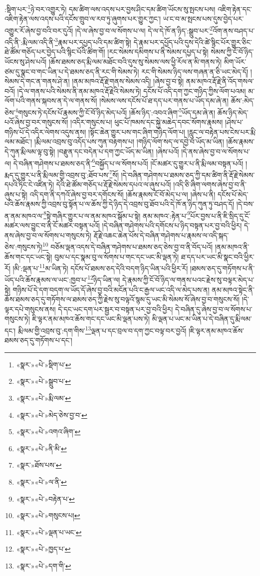 :སྡིག་པར་\footnote{«སྣར་»«པེ་»སྡིག་པ་}ཉེ་བར་འགྱུར་ཏེ། དམ་ཚིག་ལས་འདས་པར་བྱས་ཤིང་དམ་ཚིག་ཡོངས་སུ་སྤངས་པས། འཇིག་རྟེན་དང་འཇིག་རྟེན་ལས་འདས་པའི་དངོས་གྲུབ་ལ་རབ་ཏུ་ཞུགས་པར་གྱུར་ཀྱང་། ཡ་ང་བ་མ་སྤངས་པས་དུས་བྱེད་པར་འགྱུར་རོ་ཞེས་བྱ་བའི་བར་དུའོ། །དེ་ལ་ཞེས་བྱ་བ་ལ་སོགས་པ་ལ། དེ་ལ་དེ་ཁོ་ན་ཉིད་:སྒྲུབ་པར་\footnote{«སྣར་»«པེ་»སྒྲུབ་པ་}འོག་ནས་བཤད་པ་འདི་ནི་:རྨི་ལམ་འདི་ནི་\footnote{«སྣར་»«པེ་»རྨི་ལམ་}རྣམ་པར་དཔྱད་པའི་དམ་ཚིག་སྟེ། དེ་རྣམ་པར་དཔྱོད་པའི་དུས་དེའི་ཚེ་སྙིང་པོར་གྱུར་ཅིང་ཐེ་ཚོམ་གཅོད་པར་བྱེད་པའི་སྙིང་པོའི་ཚིག་གོ། །རང་སེམས་དམིགས་པ་ནི་སེམས་དཔྱད་པ་སྟེ། སེམས་ཀྱི་ངོ་བོ་ཉིད་ཡོངས་སུ་ཤེས་པའོ། །ཆོས་ཐམས་ཅད་རྨི་ལམ་མཐོང་བའི་དུས་སུ་སེམས་ལས་ཕྱི་རོལ་ན་མི་གནས་ཏེ། མིག་ཡོར་ཙམ་དུ་སྣང་བ་གང་ཡིན་པ་དེ་ཐམས་ཅད་ནི་རང་གི་སེམས་ཏེ། རང་གི་སེམས་ཉིད་ལས་གཞན་ན་ཅི་ཡང་མེད་དོ། །སེམས་དེ་གང་ན་གནས་ཤེ་ན། །ནམ་མཁའ་རྡོ་རྗེ་གནས་སེམས་འདི། །ཞེས་བྱ་བ་སྟེ། ནམ་མཁའ་རྡོ་རྗེ་ནི་འོད་གསལ་བའོ། །དེ་ལ་གནས་པའི་སེམས་ནི་ནམ་མཁའ་རྡོ་རྗེའི་སེམས་ཏེ། དངོས་པོ་འདི་དག་ཀྱང་གཉིད་ཀྱིས་ལོག་པའམ། མ་ལོག་པའི་གནས་སྐབས་ན་དེ་ལ་གནས་སོ། །སེམས་ལས་དངོས་པོ་ཐ་དད་པར་གནས་པ་ཡོད་དམ་ཞེ་ན། ཆོས་:མེད་ཅེས་\footnote{«སྣར་»«པེ་»མེད་ཅེས་བྱ་བ་}གསུངས་ཏེ་དངོས་པོ་རྣམས་ཀྱི་ངོ་བོ་ཉིད་མེད་པའོ། །ཆོས་ཉིད་:འབའ་ཞིག་\footnote{«སྣར་»«པེ་»འགའ་ཞིག་}ཡོད་དམ་ཞེ་ན། ཆོས་ཉིད་མེད་པའོ་ཞེས་བྱ་བར་གསུངས་སོ། །འདིར་གསུངས་པ། ཕུང་པོ་ཁམས་དང་སྐྱེ་མཆེད་དབང་སོགས་རྣམས། །ཤེས་པ་གཉིས་པོ་དེ་འདིར་ལེགས་འདུས་ནས། །སྟོང་ཆེན་གྱུར་པས་གང་ཞིག་གཉིད་ལོག་པ། །རླུང་ལ་བརྟེན་པས་ངེས་པར་རྨི་ལམ་མཐོང་། །རྨི་ལམ་འབྲས་བུ་འདོད་པས་ཀུན་བརྟགས་པ། །གཉིད་ལོག་སད་ལ་དབྱེ་བ་ཡོད་མ་ཡིན། །ཆོས་རྣམས་དེ་ཀུན་རྨི་ལམ་ལྟ་བུ་སྟེ། །བརྫུན་དང་བདེན་པ་དག་ཀྱང་ཡོད་མ་ཡིན། །ཞེས་པའོ། །དེ་ནས་ཞེས་བྱ་བ་ལ་སོགས་པ་ལ། དེ་བཞིན་གཤེགས་པ་ཐམས་ཅད་ནི་\footnote{«སྣར་»«པེ་»ནི་མི་}བསྐྱོད་པ་ལ་སོགས་པའོ། །ངོ་མཚར་དུ་གྱུར་པ་ནི་རྨི་ལམ་བསྟན་པའོ། །རྨད་དུ་གྱུར་པ་ནི་རྨི་ལམ་གྱི་འབྲས་བུ་:ཐོབ་པས་\footnote{«སྣར་»ཐོས་པས་}སོ། །དེ་བཞིན་གཤེགས་པ་ཐམས་ཅད་ཀྱི་དམ་ཚིག་ནི་རྡོ་རྗེ་སེམས་དཔའི་ཏིང་ངེ་འཛིན་ཏེ། དེའི་ཐེ་ཚོམ་གཅོད་པ་རྡོ་རྗེ་སེམས་དཔའ་ལ་ཞུས་པའོ། །འདི་ཅི་ཞིག་ལགས་ཞེས་བྱ་བ་ནི་ཞུས་པ་སྟེ། འདི་དག་ནི་དཀའོ་ཞེས་བྱ་བར་དགོངས་སོ། །ཆོས་རྣམས་ངོ་བོ་མེད་པ་ལ། །ཞེས་པ་ནི། དངོས་པོ་མེད་པའི་ཆོས་རྣམས་ཀྱི་འབྲས་བུ་སྟོན་པ་ལ་ཆོས་ཀྱི་དེ་ཉིད་དེ་འབྲས་བུ་ཐོབ་པའི་དེ་ཁོ་ན་ཉིད་ཀུན་ཏུ་བཤད་དོ། །དེ་བས་ན་ནམ་མཁའ་ལ་\footnote{«སྣར་»«པེ་»ལ་ནི་}སྟེ་གཞིར་གྱུར་པ་ལ་ནམ་མཁའ་སྒོམ་པ་སྟེ། ནམ་མཁའ་:རྟེན་པ་\footnote{«སྣར་»«པེ་»བརྟེན་པ་}པོར་བྱས་པ་ནི་ཇི་སྲིད་དུ་ངོ་མཚར་ལས་བྱུང་བ་ནི་ངོ་མཚར་བསྟན་པའོ། །དེ་བཞིན་གཤེགས་པའི་དགོངས་པ་ཉིད་བསྟན་པར་བྱ་བའི་ཕྱིར། དེ་ནས་ཞེས་བྱ་བ་ལ་སོགས་པ་གསུངས་ཏེ། རྡོ་རྗེ་འཆང་ཆེན་པོས་དེ་བཞིན་གཤེགས་པ་རྣམས་ལ་འདི་སྐད་ཅེས་:གསུངས་ཏེ།\footnote{«སྣར་»«པེ་»གསུངས་པ།} བཅོམ་ལྡན་འདས་དེ་བཞིན་གཤེགས་པ་ཐམས་ཅད་ཅེས་བྱ་བ་ནི་བོད་པའོ། །ནམ་མཁའ་ནི་ཆོས་གང་དང་ཡང་སྟེ། བུམ་པ་དང་སྣམ་བུ་ལ་སོགས་པ་གང་དང་ཡང་མི་ལྡན་ཏེ། ཐ་དད་པར་ཡང་མི་སྣང་བའི་ཕྱིར་རོ། །མི་:ལྡན་པ་\footnote{«སྣར་»«པེ་»ལྡན་པ་ཡང་}མ་ཡིན་ཏེ། དངོས་པོ་ཐམས་ཅད་དེའི་བདག་ཉིད་ཡིན་པའི་ཕྱིར་རོ། །ཐམས་ཅད་དུ་གཏོགས་པ་ནི་ཡོད་པའི་ཆོས་རྣམས་ལ་ཡང་:ཁྱབ་པ་\footnote{«སྣར་»«པེ་»ཁྱད་པ་}ཉིད་ཡིན་ལ། དེ་རྣམས་ཀྱི་ངོ་བོ་ཉིད་ལ་གནས་པའང་རྗེས་སུ་བལྟར་མེད་པ་སྟེ། གཉིས་པོ་དེ་དག་བདག་ལ་ཡོད་དོ་ཞེས་བྱ་བའི་མངོན་པའི་ང་རྒྱལ་ཡང་འདི་ལ་མེད་པས་ན། ནམ་མཁའ་སྟེང་ནི་ཆོས་ཐམས་ཅད་དུ་གཏོགས་ལ་ཐམས་ཅད་ཀྱི་རྗེས་སུ་བལྟའོ་སྙམ་དུ་ཡང་མི་སེམས་སོ་ཞེས་བྱ་བ་གསུངས་སོ། །དེ་ལྟར་དཔེ་གསུངས་ནས། དེ་དང་ཡང་དག་པར་སྦྱར་བ་བསྟན་པར་བྱ་བའི་ཕྱིར། དེ་བཞིན་དུ་ཞེས་བྱ་བ་ལ་སོགས་པ་གསུངས་ཏེ། ཇི་ལྟར་ནམ་མཁའ་ཆོས་གང་དང་ཡང་མི་ལྡན་པས་ཏེ། མི་ལྡན་པ་ཡང་མ་ཡིན་པ་དེ་བཞིན་དུ་རྨི་ལམ་དང་། རྨི་ལམ་གྱི་འབྲས་བུ་:དག་གིས་\footnote{«སྣར་»«པེ་»དག་གི་}ལྡན་པ་དང་བྲལ་བ་དག་ཀྱང་བལྟ་བར་བྱའོ། །ཇི་ལྟར་ནམ་མཁའ་ཆོས་ཐམས་ཅད་དུ་གཏོགས་པ་དང་། 